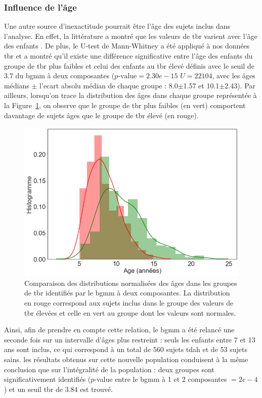 \subsubsection{Influence de l'âge}

Une autre source d'inexactitude pourrait être l'âge des sujets inclus dans l'analyse. En effet, la littérature a montré que les valeurs de \gls{tbr} varient
avec l'âge des enfants \citep{Liechti2013, Snyder2015, Perone2018}. De plus, le U-test de Mann-Whitney a été appliqué à nos données \gls{tbr} et a montré
qu'il existe une différence significative entre l'âge des enfants du groupe de \gls{tbr} plus faibles et celui des enfants au \gls{tbr} élevé définis avec 
le seuil de 3.7 du \gls{bgmm} à deux composantes
($p\text{-value} = 2.30e-15$\text{,} $U = 22 104$, avec les âges médians $\pm$ l'ecart absolu médian de chaque groupe : 8.0$\pm$1.57 et 10.1$\pm$2.43). Par ailleurs, lorsqu'on trace
la distribution des âges dans chaque groupe représentée à la Figure~\ref{Figure:tbr_age_distribution}, on observe que le groupe de \gls{tbr} plus faibles (en vert) comportent 
davantage de sujets âges que le groupe de \gls{tbr} élevé (en rouge). 

\begin{figure}[h!]
  \centering
	\includegraphics[width=0.7\linewidth]{figures/chapter-4/tbr-age-distribution} 
  \caption[Comparaison des distributions normalisées des âges dans les groupes de \gls{tbr} identifiés par le \gls{bgmm} à deux composantes.]{Comparaison des distributions 
	normalisées des âges dans les groupes de \gls{tbr} identifiés par le \gls{bgmm} à deux composantes. La distribution
	en rouge correspond aux sujets inclus dans le groupe des valeurs de \gls{tbr} élevées et celle en vert au groupe dont les valeurs sont normales.}
  \label{Figure:tbr_age_distribution}
\end{figure}

Ainsi, afin de prendre en compte cette relation, le \gls{bgmm} a été relancé une seconde fois sur un intervalle d'âges plus restreint : seuls les enfants
entre 7 et 13 ans sont inclus, ce qui correspond à un total de 560 sujets \gls{tdah} et de 53 sujets sains. les résultats obtenus sur cette nouvelle population 
conduisent à la même conclusion que sur l'intégralité de la population : deux groupes sont significativement identifiés ($p$-value entre le \gls{bgmm} à 1 et 2 
composantes $= 2e-4$) et un seuil \gls{tbr} de 3.84 est trouvé. 

